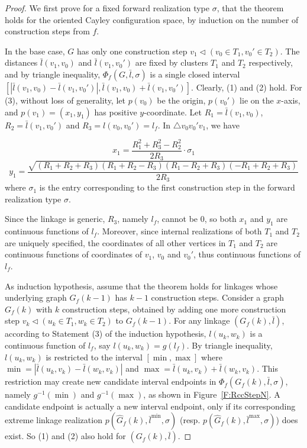 \documentclass[secthm,amsthm,english]{article}
\theoremstyle{definition}
\theoremstyle{remark}
\begin{document}
\begin{proof} 
We first prove for a fixed forward realization type $\sigma$,  
that the theorem holds for the oriented Cayley configuration space, 
by induction on the number of construction steps from $f$. 

In the base case, $G$ has only one construction step $v_{1}\triangleleft(v_{0}\in T_{1},v_{0}'\in T_{2})$.
The distances $\bar{l}(v_{1},v_{0})$ and $\bar{l}(v_{1},v_{0}')$ are
fixed by clusters $T_1$ and $T_2$ respectively, 
and by triangle inequality, 
$\Phi_{f}(G,\bar{l},\sigma)$
is a single closed interval $[|\bar{l}(v_{1},v_{0})-\bar{l}(v_{1},v_{0}')|,\bar{l}(v_{1},v_{0})+\bar{l}(v_{1},v_{0}')]$. 
Clearly,  (1) and (2) hold. 
For (3),  without loss of generality, 
let $p(v_0)$ be the origin, $p(v_0')$ lie on the $x$-axis, 
and $p(v_{1})=(x_{1},y_{1})$ has positive $y$-coordinate. 
Let $R_{1}=\bar{l}(v_{1},v_{0})$,
$R_{2}=\bar{l}(v_{1},v_{0}')$ and $R_{3}=l(v_{0},v_{0}')=l_f$.
In $\triangle v_0v_0'v_1$, we have

\[x_{1}=\frac{R_{1}^{2}+R_{3}^{2}-R_{2}^{2}}{2R_{3}} \cdot \sigma_1\]
\[y_{1}=\frac{\sqrt{(R_{1}+R_{2}+R_{3})(R_{1}+R_{2}-R_{3})(R_{1}-R_{2}+R_{3})(-R_{1}+R_{2}+R_{3})}}{2R_{3}}\]
where $\sigma_1$ is the entry corresponding to the first construction step in the forward realization type $\sigma$.  

Since the linkage is generic, $R_{3}$, namely $l_f$, cannot be $0$, 
so both $x_{1}$ and $y_{1}$ are continuous functions of $l_f$. 
Moreover, since internal realizations of both $T_{1}$ and $T_{2}$ are uniquely specified, 
the coordinates of all other vertices in $T_{1}$ and $T_{2}$ are continuous functions
of coordinates of $v_{1}$, $v_{0}$ and $v_{0}'$, thus continuous
functions of $l_f$. 

\smallskip{}




As induction hypothesis, 
assume that the theorem holds for linkages whose underlying graph $G_f(k-1)$ has $k-1$ construction steps.
Consider a graph $G_f(k)$ with $k$ construction steps, 
obtained by adding one more construction step $v_{k}\triangleleft(u_{k}\in T_{1},w_{k}\in T_{2})$
to $G_{f}(k-1)$. 
For any linkage $(G_f(k), \bar{l})$, according to Statement (3) of the induction hypothesis, 
$l(u_k,w_k)$ is a continuous function of $l_f$, say $l(u_k,w_k)=g(l_f)$. 
By triangle inequality,  $l(u_{k},w_{k})$ is restricted to the interval $[\min,\max]$
where $\min=|\bar{l}(u_{k},v_{k})-\bar{l}(w_{k},v_{k})|$ and $\max=\bar{l}(u_{k},v_{k})+\bar{l}(w_{k},v_{k})$.
This restriction may create new candidate interval endpoints in $\Phi_{f}(G_{f}(k),\bar{l}, \sigma)$,
namely $g^{-1}(\min)$ and $g^{-1}(\max)$, as shown in Figure~\ref{F:RccStepN}. 
A candidate endpoint is actually a new interval endpoint, 
only if its corresponding extreme linkage realization 
$p(\hat{G}_{f}(k),\bar{l}^{\min},\sigma)$ (resp. $p(\hat{G}_{f}(k),\bar{l}^{\max},\sigma)$) does exist. 
So (1) and (2) also hold for $(G_{f}(k),\bar{l})$.


\end{proof}
\end{document}
